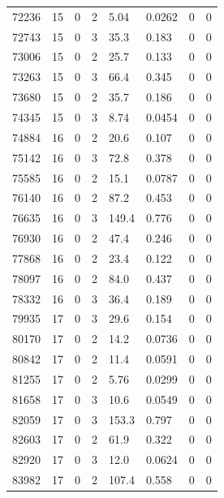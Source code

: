 \documentclass[preview]{standalone}
\begin{document}
{{{{{{{{{\begin{tabular}{L{1.2cm}C{1.2cm} C{0.3cm}C{0.5cm} C{1.4cm}C{1.4cm} C{1.4cm}C{1.4cm}}
  72236  &    15  & 0     &  2 &  5.04  & 0.0262  & 0 &  0   \\ 
  72743  &    15  & 0     &  3 &  35.3  & 0.183  & 0 &  0   \\ 
  73006  &    15  & 0     &  2 &  25.7  & 0.133  & 0 &  0   \\ 
  73263  &    15  & 0     &  3 &  66.4  & 0.345  & 0 &  0   \\ 
  73680  &    15  & 0     &  2 &  35.7  & 0.186  & 0 &  0   \\ 
  74345  &    15  & 0     &  3 &  8.74  & 0.0454  & 0 &  0   \\ 
  74884  &    16  & 0     &  2 &  20.6  & 0.107  & 0 &  0   \\ 
  75142  &    16  & 0     &  3 &  72.8  & 0.378  & 0 &  0   \\ 
  75585  &    16  & 0     &  2 &  15.1  & 0.0787  & 0 &  0   \\ 
  76140  &    16  & 0     &  2 &  87.2  & 0.453  & 0 &  0   \\ 
  76635  &    16  & 0     &  3 &  149.4  & 0.776  & 0 &  0   \\ 
  76930  &    16  & 0     &  2 &  47.4  & 0.246  & 0 &  0   \\ 
  77868  &    16  & 0     &  2 &  23.4  & 0.122  & 0 &  0   \\ 
  78097  &    16  & 0     &  2 &  84.0  & 0.437  & 0 &  0   \\ 
  78332  &    16  & 0     &  3 &  36.4  & 0.189  & 0 &  0   \\ 
  79935  &    17  & 0     &  3 &  29.6  & 0.154  & 0 &  0   \\ 
  80170  &    17  & 0     &  2 &  14.2  & 0.0736  & 0 &  0   \\ 
  80842  &    17  & 0     &  2 &  11.4  & 0.0591  & 0 &  0   \\ 
  81255  &    17  & 0     &  2 &  5.76  & 0.0299  & 0 &  0   \\ 
  81658  &    17  & 0     &  3 &  10.6  & 0.0549  & 0 &  0   \\ 
  82059  &    17  & 0     &  3 &  153.3  & 0.797  & 0 &  0   \\ 
  82603  &    17  & 0     &  2 &  61.9  & 0.322  & 0 &  0   \\ 
  82920  &    17  & 0     &  3 &  12.0  & 0.0624  & 0 &  0   \\ 
  83982  &    17  & 0     &  2 &  107.4  & 0.558  & 0 &  0   \\ 
\hline 
\end{tabular} 

}}}}}}}}}
\end{document}
